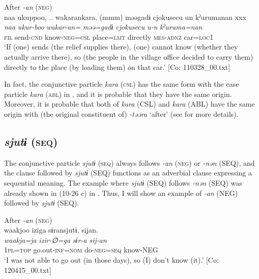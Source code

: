 \ex After \textit{{}-an} (\textsc{neg})\\
      \glll    naa  ukuppoo, ..  wakarankara,  (mmm)  məəgadɨ  {\textbar}cjokusecu{\textbar} un  kˀurumanan  xxx\\
    \textit{naa}  \textit{ukur-boo} {} \textit{wakar-an=}  {}  \textit{məə=gadɨ}  \textit{cjokusecu}    \textit{u-n}  \textit{kˀuruma=nan}  \\
    \textsc{fil}  send-\textsc{cnd} {} know-\textsc{neg}=\textsc{csl}  {}  place=\textsc{lmt}  directly   \textsc{mes}-\textsc{adnz}  car=\textsc{loc}1  \\
\glt     ‘If (one) sends (the relief supplies there), (one) cannot know (whether they actually arrive there), so (the people in the village office decided to carry them) directly to the place (by loading them) on that car.’  [Co: 110328\_00.txt]
\z
\z

  In fact, the conjunctive particle \textit{kara} (\textsc{csl}) has the same form with the case particle \textit{kara} (\textsc{abl}) in , and it is probable that they have the same origin. Moreover, it is probable that both of \textit{kara} (CSL) and \textit{kara} (ABL) have the same origin with (the original constituent of) \textit{{}-təəra} ‘after’ (see  for more details).

\subsection{\textit{sjutɨ} (\textsc{seq})}\label{sec:10.2.4}

The conjunctive particle \textit{sjutɨ} (\textsc{seq}) always follows \textit{{}-an} (\textsc{neg}) or \textit{{}-nən} (SEQ), and the clause followed by \textit{sjutɨ} (SEQ) functions as an adverbial clause expressing a sequential meaning. The example where \textit{sjutɨ} (SEQ) follows \textit{{}-nən} (SEQ) was already shown in (10-26 c) in . Thus, I will show an example of \textit{{}-an} (NEG) followed by \textit{sjutɨ} (SEQ).

\ea\label{ex:10.35}   After \textit{{}-an} (\textsc{neg})\\
      \glll    waakjoo  iziga  sɨransjutɨ,  sijan.\\
    \textit{waakja=ja}  \textit{izir-∅=ga}  \textit{sɨr-a}  \textit{sij-an}\\
    1\textsc{pl}=\textsc{top}  go.out-\textsc{inf}=\textsc{nom}  do-\textsc{neg}=\textsc{seq}  know-NEG\\
\glt     ‘I was not able to go out (in those days), so (I) don’t know (it).’  [Co: 120415\_00.txt]
\z


